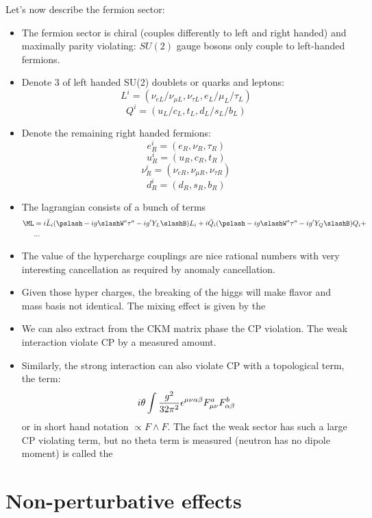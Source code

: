 \documentclass[11pt]{scrartcl}
\begin{document}
Let's now describe the fermion sector:
\begin{itemize}
	\item The fermion sector is chiral (couples differently to left and right handed) and maximally parity violating:
	$SU(2)$ gauge bosons only couple to left-handed fermions.
	\item Denote 3  of left handed SU(2) doublets or quarks and leptons:
	\[L^i = (\nu_{eL} / \nu_{\mu L}, \nu_{\tau L}, e_L / \mu_L / \tau_L )\]
	\[Q^i = (u_L / c_L, t_L, d_L / s_L / b_L) \]
	\item Denote the remaining right handed fermions:
	\[e^{i}_R = (e_R, \nu_R, \tau_R)\]
	\[u^i_R = (u_R, c_R, t_R) \]
	\[\nu^i_R = (\nu_{eR}, \nu_{\mu R}, \nu_{\tau R}) \]
	\[d^{i}_R = (d_R, s_R, b_R) \]
	\item The lagrangian consists of a bunch of terms
	\begin{align*}
		\ML &= i \bar{L}_i (\pslash - i g \slashW^a \tau^a - i g' Y_L \slashB) L_i + i \bar{Q}_i (\pslash - ig \slashW^a \tau^a- ig' Y_Q \slashB) Q_i + \\
		& ...
		\end{align*}
	\item The value of the hypercharge couplings are nice rational numbers with very interesting cancellation as required by anomaly cancellation.
	\item Given those hyper charges, the breaking of the higgs will make flavor and mass basis not identical.  The mixing effect is given by the 
	\item We can also extract from the CKM matrix phase the CP violation.  The weak interaction violate CP by a measured amount.
	\item Similarly, the strong interaction can also violate CP with a topological term, the  term:
	\[{i \theta} \int {g^2 \over 32 \pi^2} \epsilon^{\mu \nu \alpha \beta} F_{\mu \nu}^a F_{\alpha \beta}^b \]
	or in short hand notation $ \propto F \wedge F$.   The fact the weak sector has such a large CP violating term, but no theta term is measured (neutron has no dipole moment) is called the 
	\end{itemize}


\section{Non-perturbative effects}
\end{document}
